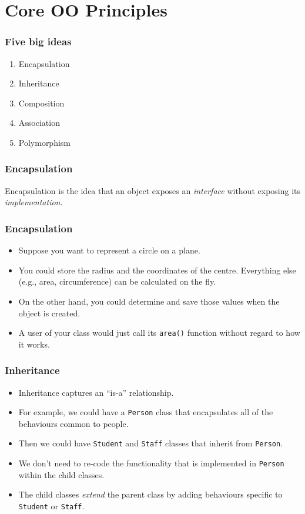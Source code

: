 \documentclass[10pt]{beamer}
\begin{document}
 
\section{Core OO Principles}
\begin{frame}
	\frametitle{Five big ideas}
	\begin{enumerate}
		\item Encapsulation
		\item Inheritance
		\item Composition
		\item Association
		\item Polymorphism
	\end{enumerate}
\end{frame}
\begin{frame}
	\frametitle{Encapsulation}

	Encapsulation is the idea that an object exposes
	an \emph{interface} without exposing its \emph{implementation}.
\end{frame}
\begin{frame}
	\frametitle{Encapsulation}

	\begin{itemize}
		\item Suppose you want to represent a circle on a plane.
		\item You could store the radius and the coordinates
			of the centre.  Everything else (e.g., area,
			circumference) can be calculated on the fly.
		\item On the other hand, you could determine and save those values
			when the object is created.
		\item A user of your class would just call its \texttt{area()}
			function without regard to how it works.
	\end{itemize}
\end{frame}
\begin{frame}
	\frametitle{Inheritance}

	\begin{itemize}
		\item Inheritance captures an ``is-a'' relationship.
		\item For example, we could have a \texttt{Person} class that 
			encapsulates all of the behaviours common to people.
		\item Then we could have \texttt{Student} and \texttt{Staff} classes
			that inherit from \texttt{Person}. 
		\item We don't need to re-code the functionality that is implemented in \texttt{Person}
			within the child classes.
		\item The child classes \emph{extend} the parent class by adding behaviours specific
			to \texttt{Student} or \texttt{Staff}.
	\end{itemize}
\end{frame}
\end{document}
